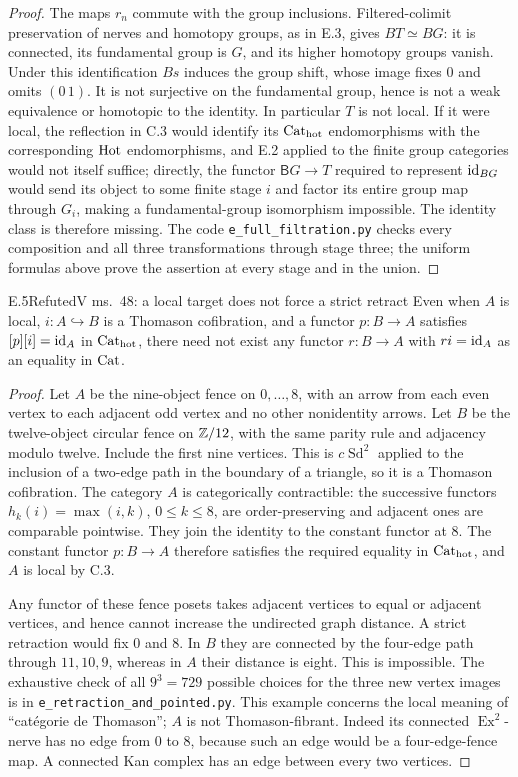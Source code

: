 \begin{proof}
The maps $r_n$ commute with the group inclusions. Filtered-colimit preservation of nerves and homotopy groups, as in E.3, gives $BT\simeq BG$: it is connected, its fundamental group is $G$, and its higher homotopy groups vanish. Under this identification $Bs$ induces the group shift, whose image fixes $0$ and omits $(0\,1)$. It is not surjective on the fundamental group, hence is not a weak equivalence or homotopic to the identity. In particular $T$ is not local. If it were local, the reflection in C.3 would identify its ${\mathrm{Cat}_{\mathrm{hot}}}$ endomorphisms with the corresponding $\mathrm{Hot}$ endomorphisms, and E.2 applied to the finite group categories would not itself suffice; directly, the functor $\mathsf BG\to T$ required to represent $\mathrm{id}_{BG}$ would send its object to some finite stage $i$ and factor its entire group map through $G_i$, making a fundamental-group isomorphism impossible. The identity class is therefore missing. The code \texttt{e\_full\_filtration.py} checks every composition and all three transformations through stage three; the uniform formulas above prove the assertion at every stage and in the union.
\end{proof}

\begin{claim}{E.5}{Refuted}{V ms.~48: a local target does not force a strict retract}
Even when $A$ is local, $i:A\hookrightarrow B$ is a Thomason cofibration, and a functor $p:B\to A$ satisfies $[p][i]=\mathrm{id}_A$ in ${\mathrm{Cat}_{\mathrm{hot}}}$, there need not exist any functor $r:B\to A$ with $ri=\mathrm{id}_A$ as an equality in $\mathrm{Cat}$.
\end{claim}
\begin{proof}
Let $A$ be the nine-object fence on $0,\ldots,8$, with an arrow from each even vertex to each adjacent odd vertex and no other nonidentity arrows. Let $B$ be the twelve-object circular fence on $\mathbb Z/12$, with the same parity rule and adjacency modulo twelve. Include the first nine vertices. This is $c\operatorname{Sd}^2$ applied to the inclusion of a two-edge path in the boundary of a triangle, so it is a Thomason cofibration. The category $A$ is categorically contractible: the successive functors $h_k(i)=\max(i,k)$, $0\leq k\leq8$, are order-preserving and adjacent ones are comparable pointwise. They join the identity to the constant functor at $8$. The constant functor $p:B\to A$ therefore satisfies the required equality in ${\mathrm{Cat}_{\mathrm{hot}}}$, and $A$ is local by C.3.

Any functor of these fence posets takes adjacent vertices to equal or adjacent vertices, and hence cannot increase the undirected graph distance. A strict retraction would fix $0$ and $8$. In $B$ they are connected by the four-edge path through $11,10,9$, whereas in $A$ their distance is eight. This is impossible. The exhaustive check of all $9^3=729$ possible choices for the three new vertex images is in \texttt{e\_retraction\_and\_pointed.py}. This example concerns the local meaning of ``cat\'egorie de Thomason''; $A$ is not Thomason-fibrant. Indeed its connected $\operatorname{Ex}^2$-nerve has no edge from $0$ to $8$, because such an edge would be a four-edge-fence map. A connected Kan complex has an edge between every two vertices.
\end{proof}

